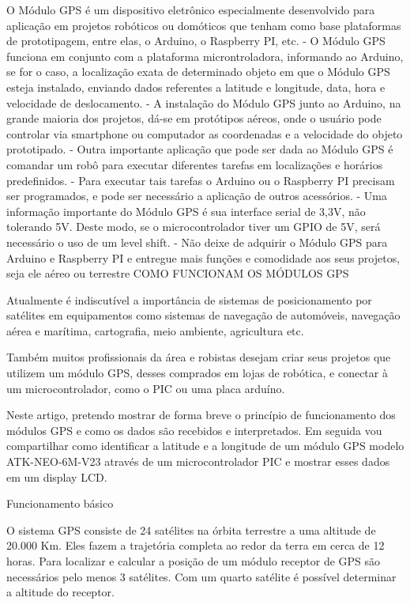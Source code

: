 O Módulo GPS é um dispositivo eletrônico especialmente desenvolvido para aplicação em projetos robóticos ou domóticos que tenham como base plataformas de prototipagem, entre elas, o Arduino, o Raspberry PI, etc.
- O Módulo GPS funciona em conjunto com a plataforma microntroladora, informando ao Arduino, se for o caso, a localização exata de determinado objeto em que o Módulo GPS esteja instalado, enviando dados referentes a latitude e longitude, data, hora e velocidade de deslocamento.
- A instalação do Módulo GPS junto ao Arduino, na grande maioria dos projetos, dá-se em protótipos aéreos, onde o usuário pode controlar via smartphone ou computador as coordenadas e a velocidade do objeto prototipado.
- Outra importante aplicação que pode ser dada ao Módulo GPS é comandar um robô para executar diferentes tarefas em localizações e horários predefinidos.
- Para executar tais tarefas o Arduino ou o Raspberry PI precisam ser programados, e pode ser necessário a aplicação de outros acessórios.
- Uma informação importante do Módulo GPS é sua interface serial de 3,3V, não tolerando 5V. Deste modo, se o microcontrolador tiver um GPIO de 5V, será necessário o uso de um level shift.
- Não deixe de adquirir o Módulo GPS para Arduino e Raspberry PI e entregue mais funções e comodidade aos seus projetos, seja ele aéreo ou terrestre
COMO FUNCIONAM OS MÓDULOS GPS

Atualmente é indiscutível a importância de sistemas de posicionamento por satélites em equipamentos como sistemas de navegação de automóveis, navegação aérea e marítima, cartografia, meio ambiente, agricultura etc.

Também muitos profissionais da área e robistas desejam criar seus projetos que utilizem um módulo GPS, desses comprados em lojas de robótica, e conectar à um microcontrolador, como o PIC ou uma placa arduíno.

Neste artigo, pretendo mostrar de forma breve o princípio de funcionamento dos módulos GPS e como os dados são recebidos e interpretados. Em seguida vou compartilhar como identificar a latitude e a longitude de um módulo GPS modelo ATK-NEO-6M-V23 através de um microcontrolador PIC e mostrar esses dados em um display LCD.
    
Funcionamento básico

O sistema GPS consiste de 24 satélites na órbita terrestre a uma altitude de 20.000 Km. Eles fazem a trajetória completa ao redor da terra em cerca de 12 horas. Para localizar e calcular a posição de um módulo receptor de GPS são necessários pelo menos 3 satélites. Com um quarto satélite é possível determinar a altitude do receptor. 

